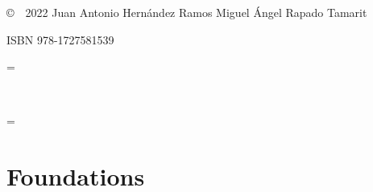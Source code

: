 \documentclass[a4paper,10pt,twoside,english]{book}
\begin{document}
       \noindent \copyright  \ \ 2022 Juan Antonio Hernández Ramos 
       \hspace{0.7cm}     Miguel Ángel Rapado Tamarit
    
    \vspace{0.5cm}            
    \noindent ISBN 978-1727581539 
    \clearpage
    
  
    \frontmatter
    
    
    \parskip = \baselineskip %
    
    \newpage
    \setlength{\parskip}{0pt}
    \tableofcontents
    ~\clearpage


    
    \parskip = \baselineskip
    
    \mainmatter
  
    \newcommand\home{./Fortran_project/sources/IEEE}
  
   
    
  \part{Foundations}\label{PartI}
         
         
         
         
         
          
         
   
 
\end{document}
